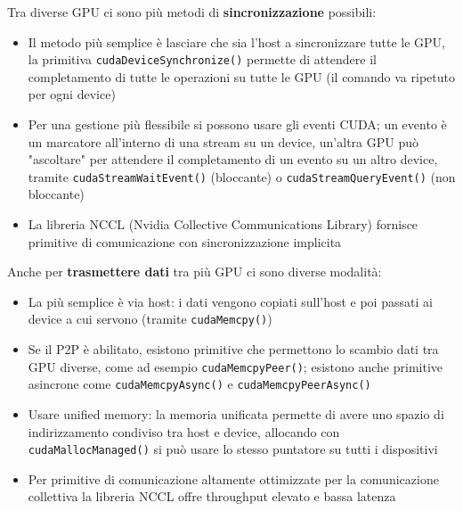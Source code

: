 \documentclass[12pt, answers]{exam}
\begin{document}
\begin{questions}
    \begin{solution}
        Tra diverse GPU ci sono più metodi di \textbf{sincronizzazione} possibili: 
        \begin{itemize}
            \item Il metodo più semplice è lasciare che sia l'host a sincronizzare tutte le GPU, la primitiva \texttt{cudaDeviceSynchronize()} permette di attendere il completamento di tutte le operazioni su tutte le GPU (il comando va ripetuto per ogni device)
            
            \item Per una gestione più flessibile si possono usare gli eventi CUDA; un evento è un marcatore all'interno di una stream su un device, un'altra GPU può "ascoltare" per attendere il completamento di un evento su un altro device, tramite \texttt{cudaStreamWaitEvent()} (bloccante) o \texttt{cudaStreamQueryEvent()} (non bloccante)
            
            \item La libreria NCCL (Nvidia Collective Communications Library) fornisce primitive di comunicazione con sincronizzazione implicita
        \end{itemize}
        
        Anche per \textbf{trasmettere dati} tra più GPU ci sono diverse modalità:
        \begin{itemize}
            \item La più semplice è via host: i dati vengono copiati sull'host e poi passati ai device a cui servono (tramite \texttt{cudaMemcpy()})
            
            \item Se il P2P è abilitato, esistono primitive che permettono lo scambio dati tra GPU diverse, come ad esempio \texttt{cudaMemcpyPeer()}; esistono anche primitive asincrone come \texttt{cudaMemcpyAsync()} e \texttt{cudaMemcpyPeerAsync()}
            
            \item Usare unified memory: la memoria unificata permette di avere uno spazio di indirizzamento condiviso tra host e device, allocando con \texttt{cudaMallocManaged()} si può usare lo stesso puntatore su tutti i dispositivi
            
            \item Per primitive di comunicazione altamente ottimizzate per la comunicazione collettiva la libreria NCCL offre throughput elevato e bassa latenza
        \end{itemize}
    \end{solution}
    

\end{questions}
\end{document}
